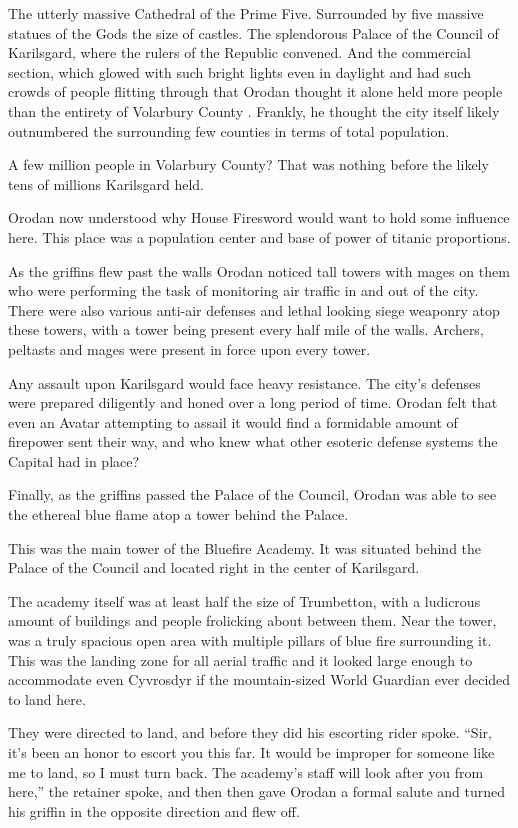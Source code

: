 \documentclass[a4paper,10pt]{book}
\begin{document}
The utterly massive Cathedral of the Prime Five. Surrounded by five massive statues of the Gods the size of castles. The splendorous Palace of the Council of Karilsgard, where the rulers of the Republic convened. And the commercial section, which glowed with such bright lights even in daylight and had such crowds of people flitting through that Orodan thought it alone held more people than the entirety of Volarbury County . Frankly, he thought the city itself likely outnumbered the surrounding few counties in terms of total population.\par
A few million people in Volarbury County? That was nothing before the likely tens of millions Karilsgard held.\par
Orodan now understood why House Firesword would want to hold some influence here. This place was a population center and base of power of titanic proportions.\par
As the griffins flew past the walls Orodan noticed tall towers with mages on them who were performing the task of monitoring air traffic in and out of the city. There were also various anti-air defenses and lethal looking siege weaponry atop these towers, with a tower being present every half mile of the walls. Archers, peltasts and mages were present in force upon every tower.\par
Any assault upon Karilsgard would face heavy resistance. The city’s defenses were prepared diligently and honed over a long period of time. Orodan felt that even an Avatar attempting to assail it would find a formidable amount of firepower sent their way, and who knew what other esoteric defense systems the Capital had in place?\par
Finally, as the griffins passed the Palace of the Council, Orodan was able to see the ethereal blue flame atop a tower behind the Palace.\par
This was the main tower of the Bluefire Academy. It was situated behind the Palace of the Council and located right in the center of Karilsgard.\par
The academy itself was at least half the size of Trumbetton, with a ludicrous amount of buildings and people frolicking about between them. Near the tower, was a truly spacious open area with multiple pillars of blue fire surrounding it. This was the landing zone for all aerial traffic and it looked large enough to accommodate even Cyvrosdyr if the mountain-sized World Guardian ever decided to land here.\par
They were directed to land, and before they did his escorting rider spoke. “Sir, it’s been an honor to escort you this far. It would be improper for someone like me to land, so I must turn back. The academy’s staff will look after you from here,” the retainer spoke, and then then gave Orodan a formal salute and turned his griffin in the opposite direction and flew off.\par
\end{document}
